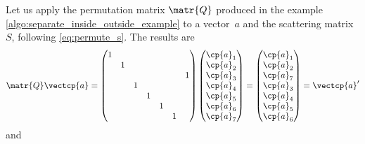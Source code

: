 Let us apply the permutation matrix $\matr{Q}$ produced in the example \cref{algo:separate_inside_outside_example} to a vector~$a$ and the scattering matrix~$S$, following \cref{eq:permute_s}.
The results are
\begin{equation}
    \matr{Q} \vectcp{a}
    =
    \begin{pmatrix}
        1  &     &     &     &     &     &     \\
           &  1  &     &     &     &     &     \\
           &     &     &     &     &     &  1  \\
           &     &  1  &     &     &     &     \\
           &     &     &  1  &     &     &     \\
           &     &     &     &  1  &     &     \\
           &     &     &     &     &  1  &     \\
    \end{pmatrix}
    \begin{pmatrix}
        \cp{a}_1 \\ \cp{a}_2 \\ \cp{a}_3 \\ \cp{a}_4 \\ \cp{a}_5 \\ \cp{a}_6 \\ \cp{a}_7
    \end{pmatrix}
    =
    \begin{pmatrix}
        \cp{a}_1 \\ \cp{a}_2 \\ \cp{a}_7 \\ \cp{a}_3 \\ \cp{a}_4 \\ \cp{a}_5 \\ \cp{a}_6
    \end{pmatrix}
    =
    \vectcp{a}'
    \label{eq:q_a_aprime}
\end{equation}
and

